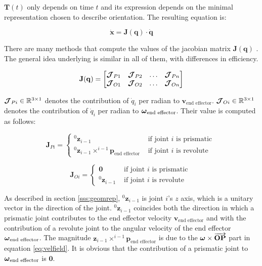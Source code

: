 $\mathbf{T}(t)$ only depends on time $t$ and its expression depends on the minimal representation chosen to describe orientation. The resulting equation is:

\begin{equation}
    \label{eq:FIK}
    \mathbf{\dot{x}} = \mathbf{J}(\mathbf{{q}}) \cdot \mathbf{\dot{q}}
\end{equation}

There are many methods that compute the values of the jacobian matrix $\mathbf{J}(\mathbf{{q}})$ \cite{Orin1984}. The general idea underlying is similar in all of them, with differences in efficiency.

$$
\mathbf{J}(\mathbf{{q}}) = \begin{bmatrix} \mbox{\boldmath$\mathcal{J}$}_{P1} & \mbox{\boldmath$\mathcal{J}$}_{P2} & \dots & \mbox{\boldmath$\mathcal{J}$}_{Pn} \\  \mbox{\boldmath$\mathcal{J}$}_{O1} & \mbox{\boldmath$\mathcal{J}$}_{O2} & \dots & \mbox{\boldmath$\mathcal{J}$}_{On} \end{bmatrix}
$$

$\mbox{\boldmath$\mathcal{J}$}_{Pi} \in \mathbb{R}^{3 \times 1}$ denotes the contribution of $\dot{q}_i$ per radian to $\mathbf{v}_{\text{end effector}}$. $\mbox{\boldmath$\mathcal{J}$}_{Oi} \in \mathbb{R}^{3 \times 1}$ denotes the contribution of $\dot{q}_i$ per radian to $\mbox{\boldmath$\omega$}_{\text{end effector}}$. Their value is computed as follows:

$$
\boldsymbol{J}_{P i}=\left\{\begin{array}{ll}
^{0}\mathbf{z}_{i-1} & \text { if joint } i \text { is prismatic } \\
^{0}\mathbf{z}_{i-1} \times ^{i-1}\boldsymbol{p}_{\text{end effector}} & \text { if joint } i \text { is revolute }
\end{array}\right.
$$

$$
\boldsymbol{J}_{O i}=\left\{\begin{array}{ll}
\mathbf{0} & \text { if joint } i \text { is prismatic } \\
^{0}\mathbf{z}_{i-1} & \text { if joint } i \text { is revolute }
\end{array}\right.
$$

As described in section \ref{sss:geomrep}, $^{0}\mathbf{z}_{i-1}$ is joint $i$'s $z$ axis, which is a unitary vector in the direction of the joint. $^{0}\mathbf{z}_{i-1}$ coincides both the direction in which a prismatic joint contributes to the end effector velocity $\mathbf{v}_{\text{end effector}}$ and with the contribution of a revolute joint to the angular velocity of the end effector $\mbox{\boldmath$\omega$}_{\text{end effector}}$. The magnitude $\mathbf{z}_{i-1} \times ^{i-1}\boldsymbol{p}_{\text{end effector}}$ is due to the $\mbox{\boldmath$\omega$} \times \overrightarrow{\mathbf{OP}}$ part in equation \ref{eq:velfield}. It is obvious that the contribution of a prismatic joint to $\mbox{\boldmath$\omega$}_{\text{end effector}}$ is $\mathbf{0}$.

